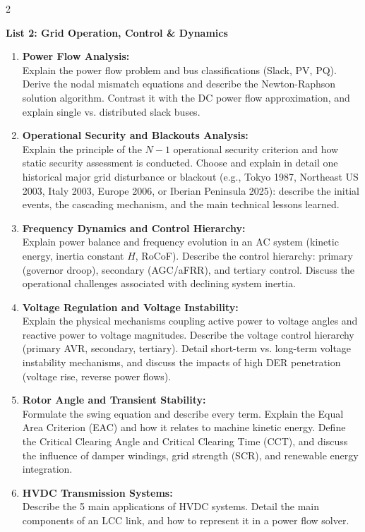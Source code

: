 \documentclass[a4paper,10pt]{article}
\begin{document}
\begin{multicols}{2}
\columnbreak

\textbf{\large List 2: Grid Operation, Control \& Dynamics}
\vspace{0.2em}
\begin{enumerate}[leftmargin=*, itemsep=0.35em, topsep=0.2em]
    \item \textbf{Power Flow Analysis:}\\
    Explain the power flow problem and bus classifications (Slack, PV, PQ). Derive the nodal mismatch equations and describe the Newton-Raphson solution algorithm. Contrast it with the DC power flow approximation, and explain single vs. distributed slack buses.
    
    \item \textbf{Operational Security and Blackouts Analysis:}\\
    Explain the principle of the $N-1$ operational security criterion and how static security assessment is conducted. Choose and explain in detail one historical major grid disturbance or blackout (e.g., Tokyo 1987, Northeast US 2003, Italy 2003, Europe 2006, or Iberian Peninsula 2025): describe the initial events, the cascading mechanism, and the main technical lessons learned.
    
    \item \textbf{Frequency Dynamics and Control Hierarchy:}\\
    Explain power balance and frequency evolution in an AC system (kinetic energy, inertia constant $H$, RoCoF). Describe the control hierarchy: primary (governor droop), secondary (AGC/aFRR), and tertiary control. Discuss the operational challenges associated with declining system inertia.
    
    \item \textbf{Voltage Regulation and Voltage Instability:}\\
    Explain the physical mechanisms coupling active power to voltage angles and reactive power to voltage magnitudes. Describe the voltage control hierarchy (primary AVR, secondary, tertiary). Detail short-term vs. long-term voltage instability mechanisms, and discuss the impacts of high DER penetration (voltage rise, reverse power flows).
    
    \item \textbf{Rotor Angle and Transient Stability:}\\
    Formulate the swing equation and describe every term. Explain the Equal Area Criterion (EAC) and how it relates to machine kinetic energy. Define the Critical Clearing Angle and Critical Clearing Time (CCT), and discuss the influence of damper windings, grid strength (SCR), and renewable energy integration.

    \item \textbf{HVDC Transmission Systems:}\\
    Describe the 5 main applications of HVDC systems. Detail the main components of an LCC link, and how to represent it in a power flow solver.
\end{enumerate}

\end{multicols}
\end{document}

